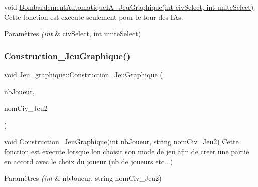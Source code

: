 void \hyperlink{classJeu__graphique_ada61d087659270184bc8a1ceac9c78f6}{Bombardement\+Automatique\+I\+A\+\_\+\+Jeu\+Graphique(int civ\+Select, int unite\+Select)} Cette fonction est execute seulement pour le tour des I\+As. 


\begin{DoxyParams}{Paramètres}
{\em (int} & civ\+Select, int unite\+Select) \\
\hline
\end{DoxyParams}
\mbox{\label{classJeu__graphique_ae57233f761d45a577584fa3dfe1603b3}} 
\subsubsection{\texorpdfstring{Construction\+\_\+\+Jeu\+Graphique()}{Construction\_JeuGraphique()}}
{\footnotesize\ttfamily void Jeu\+\_\+graphique\+::\+Construction\+\_\+\+Jeu\+Graphique (\begin{DoxyParamCaption}\item[{int}]{nb\+Joueur,  }\item[{string}]{nom\+Civ\+\_\+\+Jeu2 }\end{DoxyParamCaption})}



void \hyperlink{classJeu__graphique_ae57233f761d45a577584fa3dfe1603b3}{Construction\+\_\+\+Jeu\+Graphique(int nb\+Joueur, string nom\+Civ\+\_\+\+Jeu2)} Cette fonction est execute lorsque l\textquotesingle{}on choisit son mode de jeu afin de creer une partie en accord avec le choix du joueur (nb de joueurs etc...) 


\begin{DoxyParams}{Paramètres}
{\em (int} & nb\+Joueur, string nom\+Civ\+\_\+\+Jeu2) \\
\hline
\end{DoxyParams}
\mbox{\label{classJeu__graphique_ae7e0d87cea4c4d9af2d2acfb44bc2fde}} 

